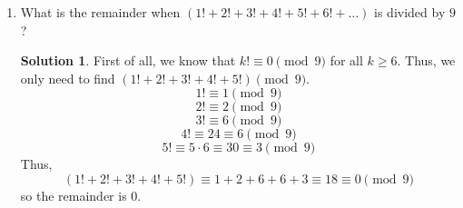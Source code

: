 \documentclass{article}
\theoremstyle{definition}
\newtheorem*{solution}{Solution}
\begin{document}
\begin{multicols}{2}
\begin{enumerate}
        \item What is the remainder when $(1! + 2! + 3! + 4! + 5! + 6! + \dots)$ is divided by $9$?
            \begin{solution}
                First of all, we know that $k! \equiv 0 \pmod{9}$ for all $k \geq 6$.
                Thus, we only need to find $(1! + 2! + 3! + 4! + 5!) \pmod{9}$.
                $$1! \equiv 1 \pmod{9}$$
                $$2! \equiv 2 \pmod{9}$$
                $$3! \equiv 6 \pmod{9}$$
                $$4! \equiv 24 \equiv 6 \pmod{9}$$
                $$5! \equiv 5 \cdot 6 \equiv 30 \equiv 3 \pmod{9}$$
                Thus, $$(1! + 2! + 3! + 4! + 5!) \equiv 1 + 2 + 6 + 6 + 3 \equiv 18 \equiv 0 \pmod{9}$$ so the remainder is 0.
            \end{solution}
    \end{enumerate}
\end{multicols}
\end{document}
